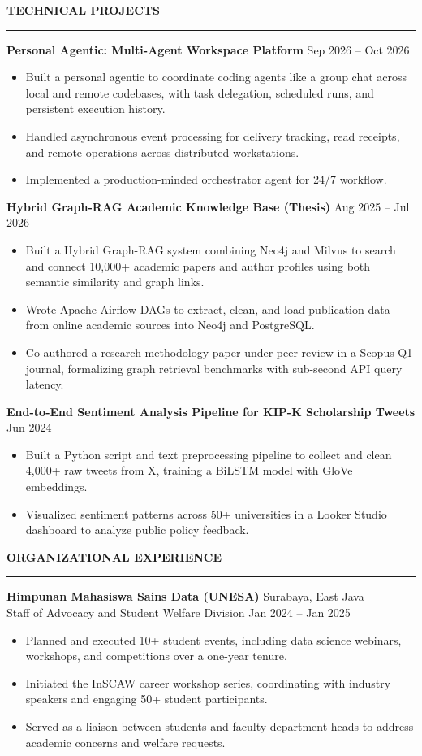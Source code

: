 \documentclass[a4paper,10pt]{article}
\newcommand{\cvsection}[1]{%
    \vspace{5pt}%
    {\fontsize{10.5pt}{12pt}\selectfont \textbf{#1}}\\[-4pt]%
    \rule{\textwidth}{0.5pt}%
    \vspace{2.5pt}%
}
\begin{document}
\newpage

\cvsection{TECHNICAL PROJECTS}

\textbf{Personal Agentic: Multi-Agent Workspace Platform} \hfill Sep 2026 -- Oct 2026
\begin{itemize}
    \item Built a personal agentic to coordinate coding agents like a group chat across local and remote codebases, with task delegation, scheduled runs, and persistent execution history.
    \item Handled asynchronous event processing for delivery tracking, read receipts, and remote operations across distributed workstations.
    \item Implemented a production-minded orchestrator agent for 24/7 workflow.
\end{itemize}

\vspace{4pt}
\textbf{Hybrid Graph-RAG Academic Knowledge Base (Thesis)} \hfill Aug 2025 -- Jul 2026
\begin{itemize}
    \item Built a Hybrid Graph-RAG system combining Neo4j and Milvus to search and connect 10,000+ academic papers and author profiles using both semantic similarity and graph links.
    \item Wrote Apache Airflow DAGs to extract, clean, and load publication data from online academic sources into Neo4j and PostgreSQL.
    \item Co-authored a research methodology paper under peer review in a Scopus Q1 journal, formalizing graph retrieval benchmarks with sub-second API query latency.
\end{itemize}

\vspace{4pt}
\textbf{End-to-End Sentiment Analysis Pipeline for KIP-K Scholarship Tweets} \hfill Jun 2024
\begin{itemize}
    \item Built a Python script and text preprocessing pipeline to collect and clean 4,000+ raw tweets from X, training a BiLSTM model with GloVe embeddings.
    \item Visualized sentiment patterns across 50+ universities in a Looker Studio dashboard to analyze public policy feedback.
\end{itemize}

\cvsection{ORGANIZATIONAL EXPERIENCE}

\textbf{Himpunan Mahasiswa Sains Data (UNESA)} \hfill Surabaya, East Java \\
Staff of Advocacy and Student Welfare Division \hfill Jan 2024 -- Jan 2025
\begin{itemize}
    \item Planned and executed 10+ student events, including data science webinars, workshops, and competitions over a one-year tenure.
    \item Initiated the InSCAW career workshop series, coordinating with industry speakers and engaging 50+ student participants.
    \item Served as a liaison between students and faculty department heads to address academic concerns and welfare requests.
\end{itemize}
\end{document}
